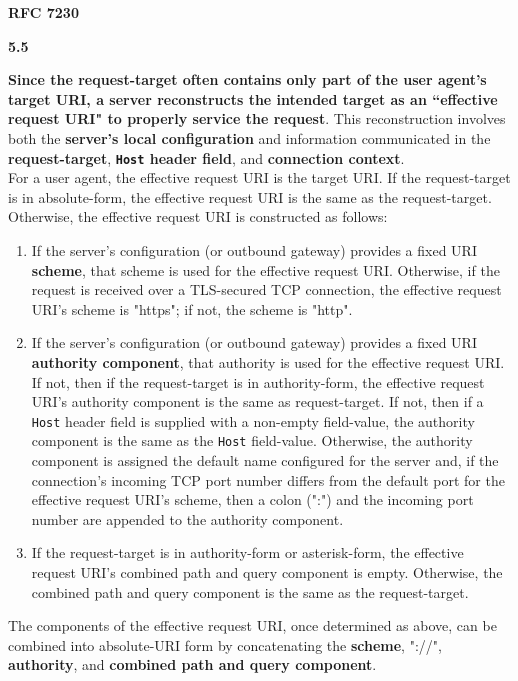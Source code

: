 \textbf{RFC 7230}
\columnseprule=1pt    %
\begin{multicols}{2}
	\begin{spacing}{0.8}
		\textbf{5.5} 
		{\footnotesize 
		\textbf{Since the request-target often contains only part of the user agent’s target URI, a server reconstructs the intended target as an ``effective request URI" to properly service the request}. This reconstruction involves both the \textbf{server’s local configuration} and information communicated in the \textbf{request-target}, \textbf{\texttt{Host} header field}, and \textbf{connection context}.\vspace{1.2ex}\\
		For a user agent, the effective request URI is the target URI. If the request-target is in absolute-form, the effective request URI is the same as the request-target. Otherwise, the effective request URI is constructed as follows:
	
		\begin{enumerate}
			\item If the server’s configuration (or outbound gateway) provides a
			fixed URI \textbf{scheme}, that scheme is used for the effective request URI. Otherwise, if the request is received over a TLS-secured TCP connection, the effective request URI’s scheme is "https"; if not, the scheme is "http".
			\item If the server’s configuration (or outbound gateway) provides a fixed URI \textbf{authority component}, that authority is used for the effective request URI. If not, then if the request-target is in authority-form, the effective request URI’s authority component is the same as request-target. If not, then if a \texttt{Host} header field is supplied with a non-empty field-value, the authority component is the same as the \texttt{Host} field-value. Otherwise, the authority component is assigned the default name configured for the server and, if the connection’s incoming TCP port number differs from the default port for the effective request URI’s scheme, then a colon (":") and the incoming port number are appended to the authority component.
			\item If the request-target is in authority-form or asterisk-form, the
			effective request URI’s combined path and query component is empty. Otherwise, the combined path and query component is the same as the request-target.
		
		\end{enumerate}
	
		The components of the effective request URI, once determined as above, can be combined into absolute-URI form by concatenating the \textbf{scheme}, "://", \textbf{authority}, and \textbf{combined path and query component}. }
	\end{spacing}
\end{multicols}	
	



